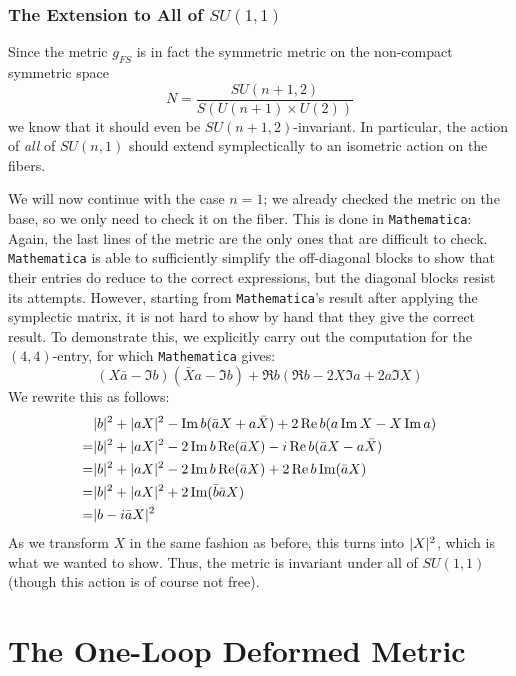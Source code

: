 \documentclass[parskip=half]{scrartcl}
\begin{document}
\subsubsection{The Extension to All of \texorpdfstring{$SU(1,1)$}{SU(1,1)}}

Since the metric $g_{FS}$ is in fact the symmetric metric on the non-compact symmetric space
\begin{equation*}
	N=\frac{SU(n+1,2)}{S(U(n+1)\times U(2))}
\end{equation*}
we know that it should even be $SU(n+1,2)$-invariant. In particular, the action of \emph{all} of $SU(n,1)$ should extend symplectically to an isometric action on the fibers. 

We will now continue with the case $n=1$; we already checked the metric on the base, so we only need to check it on the fiber. This is done in \texttt{Mathematica}: Again, the last lines of the metric are the only ones that are difficult to check. \texttt{Mathematica} is able to sufficiently simplify the off-diagonal blocks to show that their entries do reduce to the correct expressions, but the diagonal blocks resist its attempts. However, starting from \texttt{Mathematica}'s result after applying the symplectic matrix, it is not hard to show by hand that they give the correct result. To demonstrate this, we explicitly carry out the computation for the $(4,4)$-entry, for which \texttt{Mathematica} gives:
\begin{equation*}
	(X\bar a-\Im b)(\bar X a -\Im b)+\Re b (\Re b-2 X\Im a +2 a \Im X)
\end{equation*}
We rewrite this as follows:
\begin{align*}
	&\lvert b \rvert^2+\lvert aX \rvert^2-\operatorname{Im} b(\bar a X+a \bar X)+2\operatorname{Re} b(a \operatorname{Im} X- X\operatorname{Im} a)\\
	=&\lvert b \rvert^2+\lvert aX \rvert^2-2\operatorname{Im} b\operatorname{Re}(\bar a X)-i\operatorname{Re} b(\bar a X-a\bar X)\\
	=&\lvert b \rvert^2+\lvert aX \rvert^2-2\operatorname{Im} b\operatorname{Re}(\bar a X)+2\operatorname{Re} b\operatorname{Im}(\bar a X)\\
	=&\lvert b \rvert^2+\lvert aX \rvert^2+2\operatorname{Im}(\bar b \bar a X)\\
	=&\lvert b-i\bar a X \rvert^2
\end{align*}
As we transform $X$ in the same fashion as before, this turns into $\lvert X \rvert^2$, which is what we wanted to show. Thus, the metric is invariant under all of $SU(1,1)$ (though this action is of course not free).

\section{The One-Loop Deformed Metric}
\end{document}
